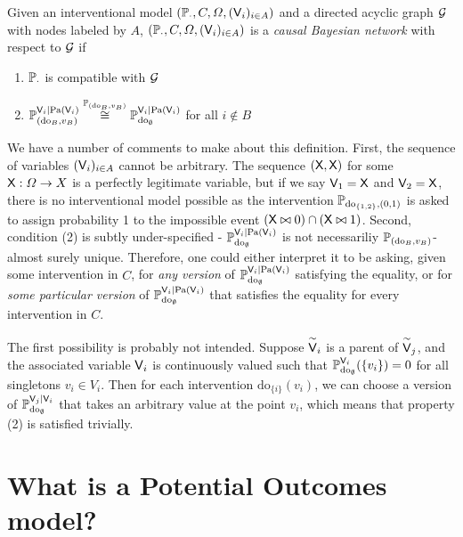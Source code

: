 \begin{definition}
Given an interventional model $(\mathbb{P}_\cdot,C,\Omega,(\mathsf{V}_i)_{i\in A})$ and a directed acyclic graph $\mathcal{G}$ with nodes labeled by $A$, $(\mathbb{P}_\cdot,C,\Omega,(\mathsf{V}_i)_{i\in A})$ is a \emph{causal Bayesian network} with respect to $\mathcal{G}$ if
\begin{enumerate}
    \item $\mathbb{P}_\cdot$ is compatible with $\mathcal{G}$
    \item $\mathbb{P}_{(\mathrm{do}_{B},v_B)}^{\mathsf{V}_i|\mathrm{Pa}(\mathsf{V}_i)}\overset{\mathbb{P}_{(\mathrm{do}_{B},v_B)}}{\cong}\mathbb{P}_{\mathrm{do}_{\emptyset}}^{\mathsf{V}_i|\mathrm{Pa}(\mathsf{V}_i)}$ for all $i\not\in B$
\end{enumerate}
\end{definition}

We have a number of comments to make about this definition. First, the sequence of variables $(\mathsf{V}_i)_{i\in A}$ cannot be arbitrary. The sequence $(\mathsf{X},\mathsf{X})$ for some $\mathsf{X}:\Omega\to X$ is a perfectly legitimate variable, but if we say $\mathsf{V}_1=\mathsf{X}$ and $\mathsf{V}_2=\mathsf{X}$, there is no interventional model possible as the intervention $\mathbb{P}_{\mathrm{do}_{\{1,2\}},(0,1)}$ is asked to assign probability 1 to the impossible event $(\mathsf{X}\bowtie 0)\cap (\mathsf{X}\bowtie 1)$. Second, condition (2) is subtly under-specified - $\mathbb{P}_{\mathrm{do}_{\emptyset}}^{\mathsf{V}_i|\mathrm{Pa}(\mathsf{V}_i)}$ is not necessariliy $\mathbb{P}_{(\mathrm{do}_{B},v_B)}$-almost surely unique. Therefore, one could either interpret it to be asking, given some intervention in $C$, for \emph{any version} of $\mathbb{P}_{\mathrm{do}_{\emptyset}}^{\mathsf{V}_i|\mathrm{Pa}(\mathsf{V}_i)}$ satisfying the equality, or for \emph{some particular version} of $\mathbb{P}_{\mathrm{do}_{\emptyset}}^{\mathsf{V}_i|\mathrm{Pa}(\mathsf{V}_i)}$ that satisfies the equality for every intervention in $C$.

The first possibility is probably not intended. Suppose $\overset{\sim}{\mathsf{V}}_i$ is a parent of $\overset{\sim}{\mathsf{V}}_j$, and the associated variable $\mathsf{V}_i$ is continuously valued such that $\mathbb{P}_{\mathrm{do}_{\emptyset}}^{\mathsf{V}_i}(\{v_i\})=0$ for all singletons $v_i\in V_i$. Then for each intervention $\mathrm{do}_{\{i\}}(v_i)$, we can choose a version of $\mathbb{P}_{\mathrm{do}_{\emptyset}}^{\mathsf{V}_j|\mathsf{V}_i}$ that takes an arbitrary value at the point $v_i$, which means that property (2) is satisfied trivially.

\section{What is a Potential Outcomes model?}

